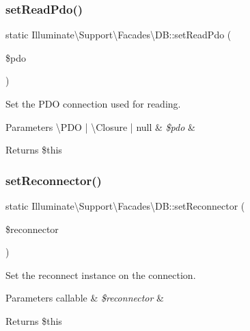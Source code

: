 \subsubsection{\texorpdfstring{set\+Read\+Pdo()}{setReadPdo()}}
{\footnotesize\ttfamily static Illuminate\textbackslash{}\+Support\textbackslash{}\+Facades\textbackslash{}\+D\+B\+::set\+Read\+Pdo (\begin{DoxyParamCaption}\item[{}]{\$pdo }\end{DoxyParamCaption})\hspace{0.3cm}{\ttfamily [static]}}

Set the P\+DO connection used for reading.


\begin{DoxyParams}[1]{Parameters}
\textbackslash{}\+P\+DO | \textbackslash{}\+Closure | null & {\em \$pdo} & \\
\hline
\end{DoxyParams}
\begin{DoxyReturn}{Returns}
\$this 
\end{DoxyReturn}
\mbox{\label{class_illuminate_1_1_support_1_1_facades_1_1_d_b_ab2c074b6ece85279ce8edbc4279d5c1a}} 
\subsubsection{\texorpdfstring{set\+Reconnector()}{setReconnector()}}
{\footnotesize\ttfamily static Illuminate\textbackslash{}\+Support\textbackslash{}\+Facades\textbackslash{}\+D\+B\+::set\+Reconnector (\begin{DoxyParamCaption}\item[{}]{\$reconnector }\end{DoxyParamCaption})\hspace{0.3cm}{\ttfamily [static]}}

Set the reconnect instance on the connection.


\begin{DoxyParams}[1]{Parameters}
callable & {\em \$reconnector} & \\
\hline
\end{DoxyParams}
\begin{DoxyReturn}{Returns}
\$this 
\end{DoxyReturn}
\mbox{\label{class_illuminate_1_1_support_1_1_facades_1_1_d_b_ad43cad4300f721b01b177987a20b40ea}} 
